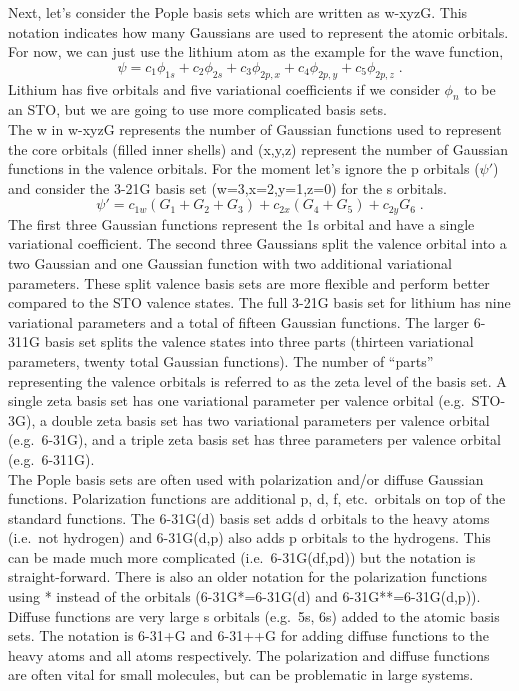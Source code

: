 \documentclass[12pt]{report}
\begin{document}
Next, let's consider the Pople basis sets which are written as w-xyzG.
This notation indicates how many Gaussians are used to represent the atomic
orbitals.
For now, we can just use the lithium atom as the example for the wave
function,
\begin{equation}
 \psi = c_1\phi_{1s} + c_2\phi_{2s} + c_3\phi_{2p,x} +
 c_4\phi_{2p,y} + c_5\phi_{2p,z} \; .
\end{equation}
Lithium has five orbitals and five variational coefficients if we consider
$\phi_n$ to be an STO, but we are going to use more complicated basis sets. \\

The w in w-xyzG represents the number of Gaussian functions used to represent
the core orbitals (filled inner shells) and (x,y,z) represent the number of
Gaussian functions in the valence orbitals.
For the moment let's ignore the p orbitals ($\psi'$) and consider the 3-21G
basis set (w=3,x=2,y=1,z=0) for the s orbitals.
\begin{equation}
 \psi' = c_{1w}(G_1+G_2+G_3)+c_{2x}(G_4+G_5)+c_{2y}G_6 \; .
\end{equation}
The first three Gaussian functions represent the 1s orbital and have a single
variational coefficient.
The second three Gaussians split the valence orbital into a two Gaussian and
one Gaussian function with two additional variational parameters.
These split valence basis sets are more flexible and perform better compared
to the STO valence states.
The full 3-21G basis set for lithium has nine variational parameters and a
total of fifteen Gaussian functions.
The larger 6-311G basis set splits the valence states into three parts
(thirteen variational parameters, twenty total Gaussian functions).
The number of ``parts'' representing the valence orbitals is referred to as 
the zeta level of the basis set.
A single zeta basis set has one variational parameter per valence orbital
(e.g.\ STO-3G), a double zeta basis set has two variational parameters per
valence orbital (e.g.\ 6-31G), and a triple zeta basis set has three parameters
per valence orbital (e.g.\ 6-311G). \\

The Pople basis sets are often used with polarization and/or diffuse Gaussian
functions.
Polarization functions are additional p, d, f, etc.\ orbitals on top of the
standard functions.
The 6-31G(d) basis set adds d orbitals to the heavy atoms (i.e.\ not hydrogen)
and 6-31G(d,p) also adds p orbitals to the hydrogens.
This can be made much more complicated (i.e.\ 6-31G(df,pd)) but the notation is
straight-forward.
There is also an older notation for the polarization functions using * instead
of the orbitals (6-31G*=6-31G(d) and 6-31G**=6-31G(d,p)).
Diffuse functions are very large s orbitals (e.g.\ 5s, 6s) added to the atomic
basis sets.
The notation is 6-31+G and 6-31++G for adding diffuse functions to the heavy
atoms and all atoms respectively.
The polarization and diffuse functions are often vital for small molecules,
but can be problematic in large systems. \\
\end{document}
